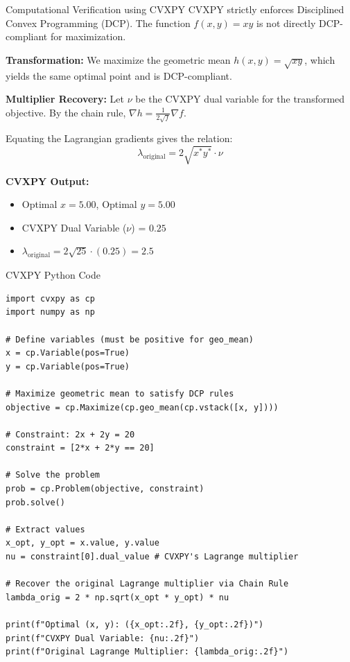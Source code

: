 \documentclass{beamer}
\begin{document}
\begin{frame}{Computational Verification using CVXPY}
    CVXPY strictly enforces Disciplined Convex Programming (DCP). The function $f(x,y) = xy$ is not directly DCP-compliant for maximization.
    
    \vspace{0.3cm}
    \textbf{Transformation:} We maximize the geometric mean $h(x,y) = \sqrt{xy}$, which yields the same optimal point and is DCP-compliant.
    
    \vspace{0.3cm}
    \textbf{Multiplier Recovery:} Let $\nu$ be the CVXPY dual variable for the transformed objective. By the chain rule, $\nabla h = \frac{1}{2\sqrt{f}} \nabla f$. 
    
    Equating the Lagrangian gradients gives the relation:
    \begin{equation}
        \lambda_{\text{original}} = 2 \sqrt{x^* y^*} \cdot \nu
    \end{equation}
    
    \textbf{CVXPY Output:}
    \begin{itemize}
        \item Optimal $x = 5.00$, Optimal $y = 5.00$
        \item CVXPY Dual Variable ($\nu$) = $0.25$
        \item $\lambda_{\text{original}} = 2 \sqrt{25} \cdot (0.25) = 2.5$
    \end{itemize}
\end{frame}

\begin{frame}[fragile]{CVXPY Python Code}
\begin{lstlisting}
import cvxpy as cp
import numpy as np

# Define variables (must be positive for geo_mean)
x = cp.Variable(pos=True)
y = cp.Variable(pos=True)

# Maximize geometric mean to satisfy DCP rules
objective = cp.Maximize(cp.geo_mean(cp.vstack([x, y])))

# Constraint: 2x + 2y = 20
constraint = [2*x + 2*y == 20]

# Solve the problem
prob = cp.Problem(objective, constraint)
prob.solve()

# Extract values
x_opt, y_opt = x.value, y.value
nu = constraint[0].dual_value # CVXPY's Lagrange multiplier

# Recover the original Lagrange multiplier via Chain Rule
lambda_orig = 2 * np.sqrt(x_opt * y_opt) * nu

print(f"Optimal (x, y): ({x_opt:.2f}, {y_opt:.2f})")
print(f"CVXPY Dual Variable: {nu:.2f}")
print(f"Original Lagrange Multiplier: {lambda_orig:.2f}")
\end{lstlisting}
\end{frame}
\end{document}

